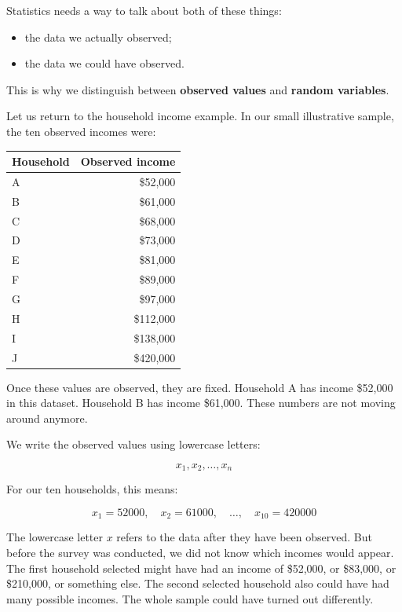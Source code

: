 \documentclass[
  letterpaper,
  DIV=11,
  numbers=noendperiod]{scrreprt}
\providecommand{\tightlist}{%
  \setlength{\itemsep}{0pt}\setlength{\parskip}{0pt}}
\begin{document}
Statistics needs a way to talk about both of these things:

\begin{itemize}
\tightlist
\item
  the data we actually observed;
\item
  the data we could have observed.
\end{itemize}

This is why we distinguish between \textbf{observed values} and
\textbf{random variables}.

Let us return to the household income example. In our small illustrative
sample, the ten observed incomes were:

\begin{table}
\fontsize{12.0pt}{14.0pt}\selectfont
\begin{tabular*}{\linewidth}{@{\extracolsep{\fill}}lr}
\toprule
Household & Observed income \\ 
\midrule\addlinespace[2.5pt]
A & \$52,000 \\ 
B & \$61,000 \\ 
C & \$68,000 \\ 
D & \$73,000 \\ 
E & \$81,000 \\ 
F & \$89,000 \\ 
G & \$97,000 \\ 
H & \$112,000 \\ 
I & \$138,000 \\ 
J & \$420,000 \\ 
\bottomrule
\end{tabular*}
\end{table}

Once these values are observed, they are fixed. Household A has income
\$52,000 in this dataset. Household B has income \$61,000. These numbers
are not moving around anymore.

We write the observed values using lowercase letters:

\[
x_1, x_2, \ldots, x_n
\]

For our ten households, this means:

\[
x_1 = 52000,\quad x_2 = 61000,\quad \ldots,\quad x_{10} = 420000
\]

The lowercase letter \(x\) refers to the data after they have been
observed. But before the survey was conducted, we did not know which
incomes would appear. The first household selected might have had an
income of \$52,000, or \$83,000, or \$210,000, or something else. The
second selected household also could have had many possible incomes. The
whole sample could have turned out differently.
\end{document}
